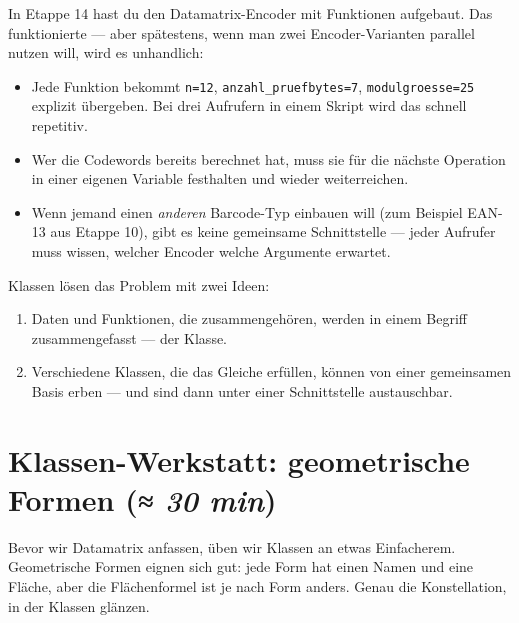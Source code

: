 In Etappe 14 hast du den Datamatrix-Encoder mit Funktionen aufgebaut.
Das funktionierte — aber spätestens, wenn man zwei Encoder-Varianten
parallel nutzen will, wird es unhandlich:

\begin{itemize}
\item Jede Funktion bekommt \texttt{n=12}, \texttt{anzahl\_pruefbytes=7},
  \texttt{modulgroesse=25} explizit übergeben. Bei drei Aufrufern in
  einem Skript wird das schnell repetitiv.
\item Wer die Codewords bereits berechnet hat, muss sie für die nächste
  Operation in einer eigenen Variable festhalten und wieder weiterreichen.
\item Wenn jemand einen \emph{anderen} Barcode-Typ einbauen will (zum
  Beispiel EAN-13 aus Etappe 10), gibt es keine gemeinsame Schnittstelle
  — jeder Aufrufer muss wissen, welcher Encoder welche Argumente erwartet.
\end{itemize}

Klassen lösen das Problem mit zwei Ideen:

\begin{enumerate}
\item Daten und Funktionen, die zusammengehören, werden in einem
  Begriff zusammengefasst — der Klasse.
\item Verschiedene Klassen, die das Gleiche erfüllen, können von
  einer gemeinsamen Basis erben — und sind dann unter einer
  Schnittstelle austauschbar.
\end{enumerate}

\section{Klassen-Werkstatt: geometrische Formen \normalfont(\textit{≈ 30 min})}

Bevor wir Datamatrix anfassen, üben wir Klassen an etwas
Einfacherem. Geometrische Formen eignen sich gut: jede Form hat
einen Namen und eine Fläche, aber die Flächenformel ist je nach
Form anders. Genau die Konstellation, in der Klassen glänzen.

